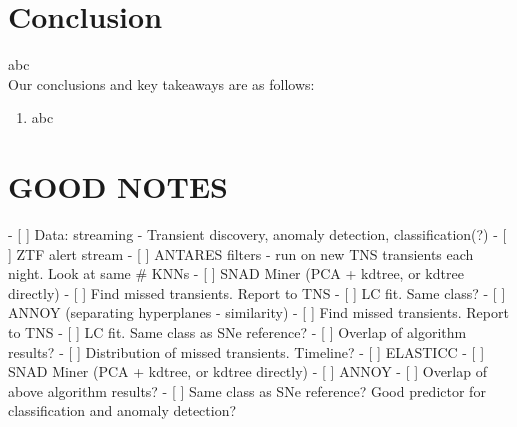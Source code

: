 \documentclass[twocolumn]{aastex63}
\begin{document}




\section{Conclusion} \label{sec:conclusion}

abc\\

Our conclusions and key takeaways are as follows:
\begin{enumerate}
    \item abc
\end{enumerate}

\section{GOOD NOTES} \label{sec:notes}

- [ ] Data: streaming - Transient discovery, anomaly detection, classification(?)
    - [ ] ZTF alert stream 
        - [ ] ANTARES filters  - run on new TNS transients each night. Look at same \# KNNs
            - [ ] SNAD Miner (PCA + kdtree, or kdtree directly)
                - [ ] Find missed transients. Report to TNS
                - [ ] LC fit. Same class?
            - [ ] ANNOY (separating hyperplanes - similarity)
                - [ ] Find missed transients. Report to TNS
                - [ ] LC fit. Same class as SNe reference?
            - [ ] Overlap of algorithm results?
            - [ ] Distribution of missed transients. Timeline?
    - [ ] ELASTICC
            - [ ] SNAD Miner (PCA + kdtree, or kdtree directly)
            - [ ] ANNOY
            - [ ] Overlap of above algorithm results?
            - [ ] Same class as SNe reference? Good predictor for classification and anomaly detection?
\end{document}
